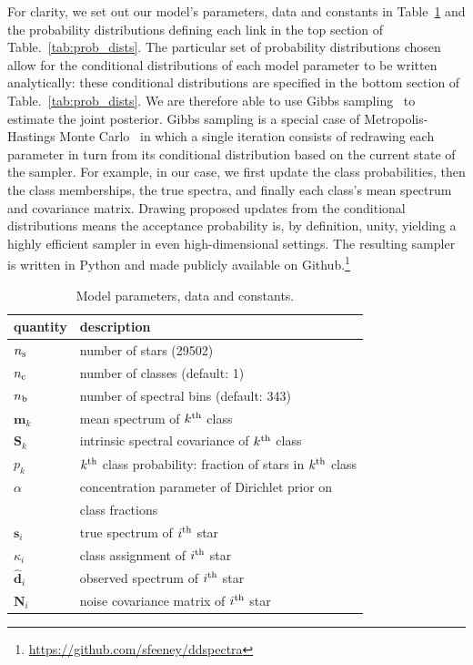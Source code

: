 \documentclass[a4paper,fleqn,usenatbib]{mnras}
\newcommand{\nb}{n_{\rm b}}
\newcommand{\nc}{n_{\rm c}}
\newcommand{\ns}{n_{\rm s}}
\newcommand{\specmean}{{\bm m}}
\newcommand{\speccov}{{\bm S}}
\newcommand{\classprob}{{p}}
\newcommand{\objspec}{{\bm s}}
\newcommand{\objclass}{{\kappa}}
\newcommand{\objdata}{\hat{\bm d}}
\newcommand{\objnoise}{{\bm N}}
\begin{document}
For clarity, we set out our model's parameters, data and constants in Table~\ref{tab:params} and the probability distributions defining each link in the top section of Table.~\ref{tab:prob_dists}. The particular set of probability distributions chosen allow for the conditional distributions of each model parameter to be written analytically: these conditional distributions are specified in the bottom section of Table.~\ref{tab:prob_dists}. We are therefore able to use Gibbs sampling~\citep{Geman_and_Geman:1984} to estimate the joint posterior. Gibbs sampling is a special case of Metropolis-Hastings Monte Carlo~\citep{Hastings:1970} in which a single iteration consists of redrawing each parameter in turn from its conditional distribution based on the current state of the sampler. For example, in our case, we first update the class probabilities, then the class memberships, the true spectra, and finally each class's mean spectrum and covariance matrix. Drawing proposed updates from the conditional distributions means the acceptance probability is, by definition, unity, yielding a highly efficient sampler in even high-dimensional settings. The resulting sampler is written in Python and made publicly available on Github.\footnote{\href{https://github.com/sfeeney/ddspectra}{https://github.com/sfeeney/ddspectra}}

\begin{table}
    \centering
    \caption{Model parameters, data and constants.}
    \label{tab:params}
    \begin{tabular}{ll}
        \hline
        quantity & description \\
        \hline
        $\ns$ & number of stars (29502) \\
        $\nc$ & number of classes (default: 1) \\
        $\nb$ & number of spectral bins (default: 343) \\
        $\specmean_k$ & mean spectrum of $k^{\rm th}$ class \\
        $\speccov_k$ & intrinsic spectral covariance of $k^{\rm th}$ class \\
        $\classprob_k$ & $k^{\rm th}$ class probability: fraction of stars in $k^{\rm th}$ class \\
        $\alpha$ & concentration parameter of Dirichlet prior on \\
         & class fractions \\
        $\objspec_i$ & true spectrum of $i^{\rm th}$ star \\
        $\objclass_i$ & class assignment of $i^{\rm th}$ star \\
        $\objdata_i$ & observed spectrum of $i^{\rm th}$ star \\
        $\objnoise_i$ & noise covariance matrix of $i^{\rm th}$ star \\
        \hline
    \end{tabular}
\end{table}
\end{document}
